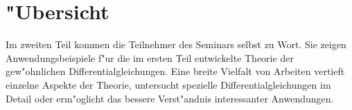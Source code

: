 %
%
%
\chapter*{"Ubersicht}
\rhead{}
\label{skript:uebersicht}
Im zweiten Teil kommen die Teilnehmer des Seminars selbst zu Wort.
Sie zeigen Anwendungsbeispiele f"ur die im ersten
Teil entwickelte Theorie der gew"ohnlichen Differentialgleichungen.
Eine breite Vielfalt von Arbeiten vertieft einzelne Aspekte der Theorie,
untersucht spezielle Differentialgleichungen im Detail
oder erm"oglicht das bessere Verst"andnis interessanter Anwendungen.

%
%
%
%
%
%
%
%
%
%
%
%
%
%
%
%
